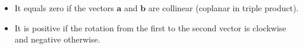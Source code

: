 \begin{itemize}
    \item It equals zero if the vectors $\mathbf a$ and $\mathbf b$ are collinear (coplanar in triple product).
    \item It is positive if the rotation from the first to the second vector is clockwise and negative otherwise.
\end{itemize}